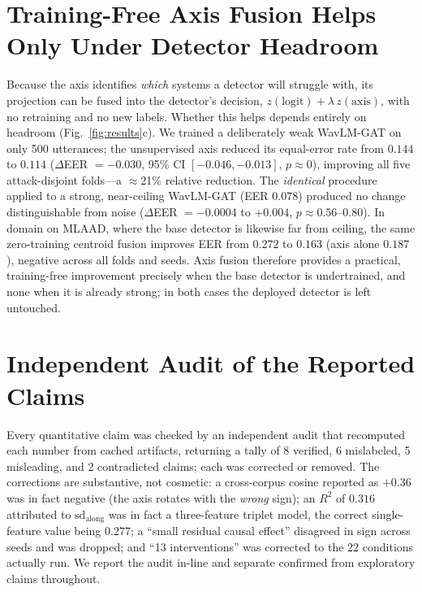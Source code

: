 \documentclass{article}
\begin{document}
\section{Training-Free Axis Fusion Helps Only Under Detector Headroom}
\label{sec:lever}
Because the axis identifies \emph{which} systems a detector will struggle with,
its projection can be fused into the detector's decision,
$z(\mathrm{logit})+\lambda\,z(\mathrm{axis})$, with no retraining and no new
labels. Whether this helps depends entirely on headroom
(Fig.~\ref{fig:results}c). We trained a deliberately weak WavLM-GAT on only 500
utterances; the unsupervised axis reduced its equal-error rate from $0.144$ to
$0.114$ ($\Delta$EER $=-0.030$, 95\% CI $[-0.046,-0.013]$, $p\approx0$), improving
all five attack-disjoint folds---a $\approx$21\% relative reduction. The
\emph{identical} procedure applied to a strong, near-ceiling WavLM-GAT (EER
$0.078$) produced no change distinguishable from noise ($\Delta$EER $=-0.0004$ to
$+0.004$, $p\approx0.56$--$0.80$). In domain on MLAAD, where the base detector is
likewise far from ceiling, the same zero-training centroid fusion improves EER from
$0.272$ to $0.163$ (axis alone $0.187$), negative across all folds and seeds. Axis
fusion therefore provides a practical, training-free improvement precisely when the
base detector is undertrained, and none when it is already strong; in both cases the
deployed detector is left untouched.

\section{Independent Audit of the Reported Claims}
\label{sec:audit}
Every quantitative claim was checked by an independent audit that recomputed each
number from cached artifacts, returning a tally of 8 verified, 6 mislabeled, 5
misleading, and 2 contradicted claims; each was corrected or removed. The
corrections are substantive, not cosmetic: a cross-corpus cosine reported as
$+0.36$ was in fact negative (the axis rotates with the \emph{wrong} sign); an
$R^2$ of $0.316$ attributed to $\mathrm{sd}_{\mathrm{along}}$ was in fact a
three-feature triplet model, the correct single-feature value being $0.277$; a
``small residual causal effect'' disagreed in sign across seeds and was dropped;
and ``13 interventions'' was corrected to the 22 conditions actually run. We report
the audit in-line and separate confirmed from exploratory claims throughout.
\end{document}
